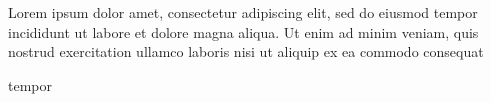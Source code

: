 \documentclass[a4paper, 12pt, twoside, draft]{article}
\begin{document}

\beginnumbering
\pstart

Lorem ipsum dolor  amet, consectetur adipiscing elit, sed do eiusmod tempor incididunt ut labore et dolore magna aliqua. Ut enim ad minim veniam, quis nostrud exercitation ullamco laboris nisi ut aliquip ex ea commodo consequat

\pend
\pausenumbering


 tempor %

\end{document}
